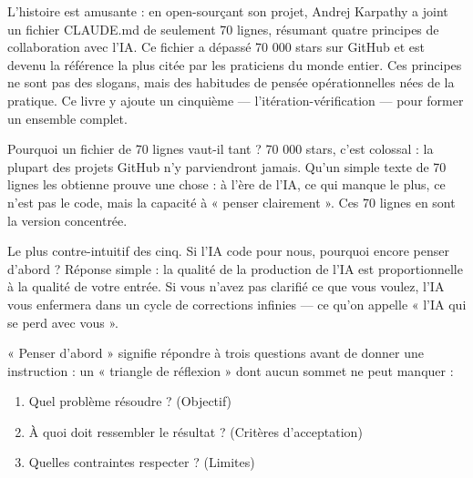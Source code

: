 

L'histoire est amusante : en open-sourçant son projet, Andrej Karpathy a joint un fichier CLAUDE.md de seulement 70 lignes, résumant quatre principes de collaboration avec l'IA. Ce fichier a dépassé 70 000 stars sur GitHub et est devenu la référence la plus citée par les praticiens du monde entier. Ces principes ne sont pas des slogans, mais des habitudes de pensée opérationnelles nées de la pratique. Ce livre y ajoute un cinquième — l'itération-vérification — pour former un ensemble complet.

\begin{tcbinfo}{Pourquoi un fichier de 70 lignes vaut-il tant ?}
70 000 stars, c'est colossal : la plupart des projets GitHub n'y parviendront jamais. Qu'un simple texte de 70 lignes les obtienne prouve une chose : à l'ère de l'IA, ce qui manque le plus, ce n'est pas le code, mais la capacité à « penser clairement ». Ces 70 lignes en sont la version concentrée.

\end{tcbinfo}


Le plus contre-intuitif des cinq. Si l'IA code pour nous, pourquoi encore penser d'abord ? Réponse simple : la qualité de la production de l'IA est proportionnelle à la qualité de votre entrée. Si vous n'avez pas clarifié ce que vous voulez, l'IA vous enfermera dans un cycle de corrections infinies — ce qu'on appelle « l'IA qui se perd avec vous ».

« Penser d'abord » signifie répondre à trois questions avant de donner une instruction : un « triangle de réflexion » dont aucun sommet ne peut manquer :

\begin{enumerate}
  \item Quel problème résoudre ? (Objectif)
  \item À quoi doit ressembler le résultat ? (Critères d'acceptation)
  \item Quelles contraintes respecter ? (Limites)
\end{enumerate}

